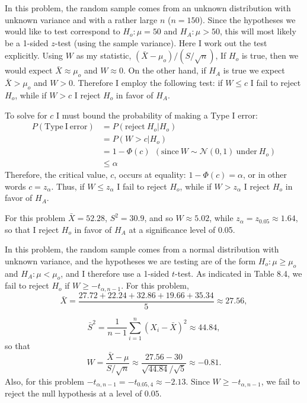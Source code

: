 \begin{problem}{17} In this problem, the random sample comes from an unknown distribution with unknown variance and with a rather large $n$ ($n=150$).  Since the hypotheses we would like to test correspond to $H_o: \mu = 50$ and $H_A:\mu > 50$, this will most likely be a 1-sided $z$-test (using the sample variance).  Here I work out the test explicitly.  Using $W$ as my statistic, $(\bar X - \mu_o)/(S/\sqrt{n})$, If $H_o$ is true, then we would expect $\bar X \approx \mu_o$ and $W\approx 0$.  On the other hand, if $H_A$ is true we expect $\bar X>\mu_o$ and $W >0$.  Therefore I employ the following test:  if $W\le c$ I fail to reject $H_o$, while if $W>c$ I reject $H_o$ in favor of $H_A$.

To solve for $c$ I must bound the probability of making a Type I error:
\begin{align*}
P(\mathrm{Type~I~error}) &= P(\mathrm{reject}~ H_o|H_o) \\
&= P(W>c|H_o) \\
& = 1-\Phi(c)~~(\mathrm{since~}W\sim \mathcal N (0, 1)~\mathrm{under}~H_o) \\
& \le \alpha 
\end{align*}
Therefore, the critical value, $c$, occurs at equality: $1-\Phi(c) = \alpha$, or in other words $c=z_{\alpha}$.  Thus, if $W\le z_\alpha$ I fail to reject $H_o$, while if $W>z_\alpha$ I reject $H_o$ in favor of $H_A$.  

For this problem $\bar X = 52.28$, $S^2 = 30.9$, and so $W \approx 5.02$, while $z_{\alpha}=z_{0.05} \approx 1.64$, so that I reject $H_o$ in favor of $H_A$ at a significance level of 0.05.


\end{problem} 

\begin{problem}{18}  In this problem, the random sample comes from a normal distribution with unknown variance, and the hypotheses we are testing are of the form $H_o: \mu \ge \mu_o$ and $H_A:\mu < \mu_o$, and I therefore use a 1-sided $t$-test.  As indicated in Table 8.4, we fail to reject $H_o$ if $W\ge -t_{\alpha, n-1}$.  For this problem, 
\begin{equation*}
\bar X = \frac{27.72+22.24+32.86+19.66+35.34}{5} \approx 27.56,
\end{equation*}

\begin{equation*}
\bar S^2 = \frac{1}{n-1} \sum_{i=1}^n (X_i-\bar X)^2 \approx 44.84,
\end{equation*}
so that
\begin{equation*}
W = \frac{\bar X - \mu}{S/\sqrt{n}} \approx \frac{27.56- 30}{\sqrt{44.84}/\sqrt{5}} \approx -0.81.
\end{equation*}
Also, for this problem $-t_{\alpha, n-1} = -t_{0.05, 4} \approx -2.13$.  Since $W\ge -t_{\alpha, n-1}$, we fail to reject the null hypothesis at a level of $0.05$.

\end{problem}

